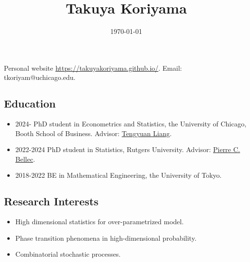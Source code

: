 \documentclass[10pt]{amsart}
\date{\today}
\title{Takuya Koriyama}
\begin{document}
\maketitle
\begin{center}
  Personal website \url{https://takuyakoriyama.github.io/}.
Email: tkoriyam@uchicago.edu.
\end{center}
\subsection*{Education}
\begin{itemize}
  \item 2024- PhD student in Econometrics and Statistics, the University of Chicago, Booth School of Business. Advisor: \href{https://tyliang.github.io}{Tengyuan Liang}. 
  \item 2022-2024 PhD student in Statistics, Rutgers University. Advisor: \href{https://statweb.rutgers.edu/PCB71/}{Pierre C. Bellec}. 
  \item 2018-2022 BE in Mathematical Engineering, the University of Tokyo. 
\end{itemize}

\subsection*{Research Interests}
\noindent
\begin{itemize}
  \item High dimensional statistics for over-parametrized model. 
  \item Phase transition phenomena in high-dimensional probability.
  \item Combinatorial stochastic processes. 
\end{itemize}
\end{document}
